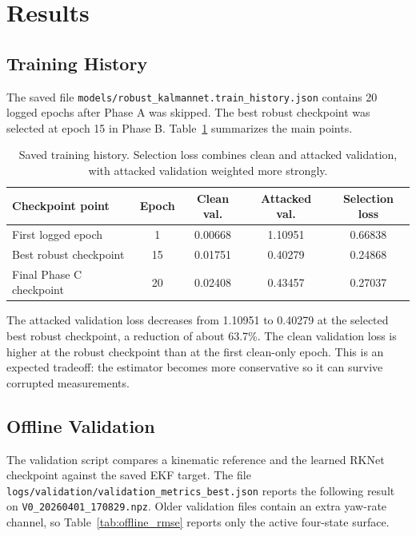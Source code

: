 \documentclass[11pt,a4paper]{article}
\begin{document}
\section{Results}

\subsection{Training History}

The saved file \texttt{models/robust\_kalmannet.train\_history.json} contains
20 logged epochs after Phase A was skipped. The best robust checkpoint was
selected at epoch 15 in Phase B. Table~\ref{tab:train_result} summarizes the
main points.

\begin{table}[htbp]
\centering
\caption{Saved training history. Selection loss combines clean and attacked
validation, with attacked validation weighted more strongly.}
\label{tab:train_result}
\begin{tabular}{lcccc}
\toprule
Checkpoint point & Epoch & Clean val. & Attacked val. & Selection loss \\
\midrule
First logged epoch & 1 & 0.00668 & 1.10951 & 0.66838 \\
Best robust checkpoint & 15 & 0.01751 & 0.40279 & 0.24868 \\
Final Phase C checkpoint & 20 & 0.02408 & 0.43457 & 0.27037 \\
\bottomrule
\end{tabular}
\end{table}

The attacked validation loss decreases from 1.10951 to 0.40279 at the selected
best robust checkpoint, a reduction of about 63.7\%. The clean validation loss
is higher at the robust checkpoint than at the first clean-only epoch. This is
an expected tradeoff: the estimator becomes more conservative so it can survive
corrupted measurements.

\subsection{Offline Validation}

The validation script compares a kinematic reference and the learned RKNet
checkpoint against the saved EKF target. The file
\texttt{logs/validation/validation\_metrics\_best.json} reports the following
result on \texttt{V0\_20260401\_170829.npz}. Older validation files contain an
extra yaw-rate channel, so Table~\ref{tab:offline_rmse} reports only the active
four-state surface.
\end{document}
